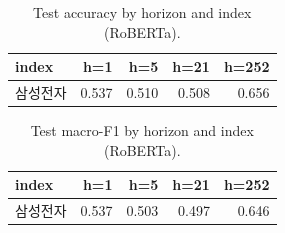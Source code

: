 \begin{table}[t]\centering
\caption{Test accuracy by horizon and index (RoBERTa).}
\begin{tabular}{lrrrr}
\toprule
index & h=1 & h=5 & h=21 & h=252 \\
\midrule
삼성전자 & 0.537 & 0.510 & 0.508 & 0.656 \\
\bottomrule
\end{tabular}
\end{table}

\begin{table}[t]\centering
\caption{Test macro-F1 by horizon and index (RoBERTa).}
\begin{tabular}{lrrrr}
\toprule
index & h=1 & h=5 & h=21 & h=252 \\
\midrule
삼성전자 & 0.537 & 0.503 & 0.497 & 0.646 \\
\bottomrule
\end{tabular}
\end{table}